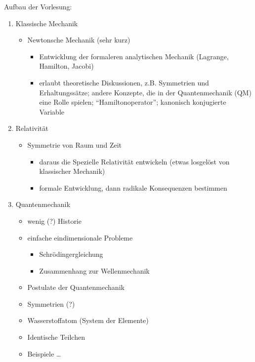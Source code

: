 Aufbau der Vorlesung:
\begin{enumerate}
	\item Klassische Mechanik
	\begin{itemize}
		\item Newtonsche Mechanik (sehr kurz)
		\begin{itemize}
			\item Entwicklung der formaleren analytischen Mechanik (Lagrange, Hamilton, Jacobi)
			\item erlaubt theoretische Diskussionen, z.B. Symmetrien und Erhaltungssätze; andere Konzepte, die in der Quantenmechanik (QM) eine Rolle spielen; "`Hamiltonoperator"'; kanonisch konjugierte Variable
		\end{itemize}
	\end{itemize}
	
	\item Relativität
	\begin{itemize}
		\item Symmetrie von Raum und Zeit
		\begin{itemize}
			\item daraus die Spezielle Relativität entwickeln (etwas losgelöst von klassischer Mechanik)
			\item formale Entwicklung, dann radikale Konsequenzen bestimmen
		\end{itemize}
	\end{itemize}
	
	\item Quantenmechanik
	\begin{itemize}
		\item wenig (?) Historie
		\item einfache eindimensionale Probleme 
		\begin{itemize}
			\item Schrödingergleichung
			\item Zusammenhang zur Wellenmechanik
		\end{itemize}
		\item Postulate der Quantenmechanik
		\item Symmetrien (?)
		\item Wasserstoffatom (System der Elemente)
		\item Identische Teilchen 
		\item Beispiele \dots
	\end{itemize}
\end{enumerate}